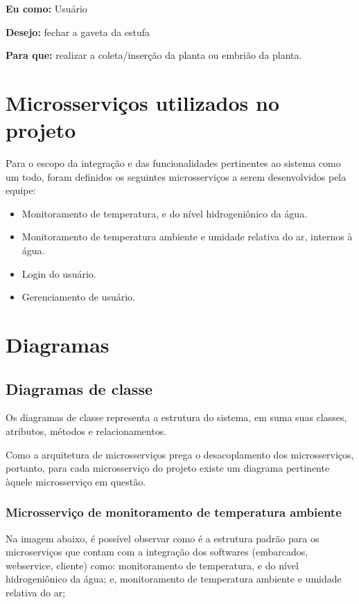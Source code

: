 	\textbf{Eu como:} Usuário
	
	\textbf{Desejo:} fechar a gaveta da estufa
	
	\textbf{Para que:} realizar a coleta/inserção da planta ou embrião da planta.


\section{Microsserviços utilizados no projeto}

Para o escopo da integração e das funcionalidades pertinentes ao sistema como um todo, foram definidos os seguintes microsserviços a serem desenvolvidos pela equipe:

\begin{itemize}
	\item Monitoramento de temperatura, e do nível hidrogeniônico da água.
	\item Monitoramento de temperatura ambiente e umidade relativa do ar, internos à água.
	\item Login do usuário.
	\item Gerenciamento de usuário.
\end{itemize}

\section{Diagramas}

\subsection{Diagramas de classe}

Os diagramas de classe representa a estrutura do sistema, em suma suas classes, atributos, métodos e relacionamentos. \cite{ibm}

Como a arquitetura de microsserviços prega o desacoplamento dos microsserviços, portanto, para cada microsserviço do projeto existe um diagrama pertinente àquele microsserviço em questão.

\subsubsection{Microsserviço de monitoramento de temperatura ambiente}

Na imagem abaixo, é possível observar como é a estrutura padrão para os microserviços que contam com a integração dos softwares (embarcados, webservice, cliente) como: monitoramento de temperatura, e do nível hidrogeniônico da água; e, monitoramento de temperatura ambiente e umidade relativa do ar;

